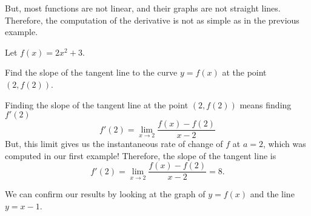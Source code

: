 \documentclass{ximera}
\begin{document}
But, most functions are not linear, and  their graphs are not  straight lines.  Therefore, the computation of the derivative is not as simple as in the previous example.

\begin{example}
	Let $f(x) = 2x^2+3$.
	
	 Find the slope of the tangent line to the curve $y=f(x)$ at the point $(2,f(2))$.
			\begin{explanation}
			  Finding the slope of the tangent line at the point $(2,f(2))$ means finding $f'(2)$
		\[
 f'(2) = \lim_{x\to 2} \frac{f(x) - f(2)}{x-2}
  \]
But, this limit gives us the instantaneous rate of change of $f$ at $a=2$, which was computed in our first example!
Therefore,	
the slope of the tangent line is 
\[
 f'(2) = \lim_{x\to 2} \frac{f(x) - f(2)}{x-2}=8.
  \]
		 	\end{explanation}
			  \begin{onlineOnly}
  We can confirm our results by looking at the graph of $y=f(x)$ and the line $y=x-1$. 
  \begin{image}
\end{image}
  \end{onlineOnly}
			
	\end{example}
\end{document}
